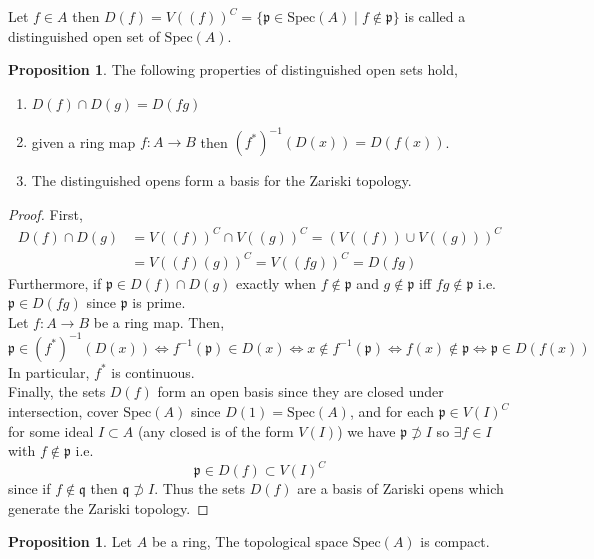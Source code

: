 \documentclass[12pt]{article}
\newcommand{\Spec}[1]{\mathrm{Spec}\left( #1 \right)}
\newcommand{\p}{\mathfrak{p}}
\newcommand{\q}{\mathfrak{q}}
\theoremstyle{remark}
\theoremstyle{definition}
\newtheorem{proposition}[theorem]{Proposition}
\newenvironment{definition}[1][Definition:]{\begin{trivlist}
\item[\hskip \labelsep {\bfseries #1}]}{\end{trivlist}}
\begin{document}
\begin{definition}
Let $f \in A$ then $D(f) = V((f))^C = \{ \p \in \Spec{A} \mid f \notin \p \}$ is called a distinguished open set of $\Spec{A}$.
\end{definition}

\begin{proposition}
The following properties of distinguished open sets hold,
\begin{enumerate}
\item $D(f) \cap D(g) = D(fg)$
\item given a ring map $f : A \to B$ then $(f^*)^{-1}(D(x)) = D(f(x))$. 
\item The distinguished opens form a basis for the Zariski topology.
\end{enumerate}
\end{proposition}

\begin{proof}
First,
\begin{align*}
D(f) \cap D(g) & = V((f))^C \cap V((g))^C = \left( V((f)) \cup V((g)) \right)^C 
\\\
& = V((f)(g))^C = V((fg))^C = D(fg) 
\end{align*}
Furthermore, if $\p \in D(f) \cap D(g)$ exactly when $f \notin \p$ and $g \notin \p$ iff $fg \notin \p$ i.e. $\p \in D(fg)$ since $\p$ is prime. 
\bigskip\\
Let $f : A \to B$ be a ring map. Then,
\[ \p \in (f^*)^{-1}(D(x)) \iff f^{-1}(\p) \in D(x) \iff x \notin f^{-1}(\p) \iff f(x) \notin \p \iff \p \in D(f(x)) \]
In particular, $f^*$ is continuous. 
\bigskip\\
Finally, the sets $D(f)$ form an open basis since they are closed under intersection, cover $\Spec{A}$ since $D(1) = \Spec{A}$, and for each $\p \in V(I)^C$ for some ideal $I \subset A$ (any closed is of the form $V(I)$) we have $\p \not\supset I$ so $\exists f \in I$ with $f \notin \p$ i.e. 
\[ \p \in D(f) \subset V(I)^C \]
since if $f \notin \q$ then $\q \not\supset I$. Thus the sets $D(f)$ are a basis of Zariski opens which generate the Zariski topology.
\end{proof}

\begin{proposition}
Let $A$ be a ring, The topological space $\Spec{A}$ is compact.
\end{proposition}
\end{document}
